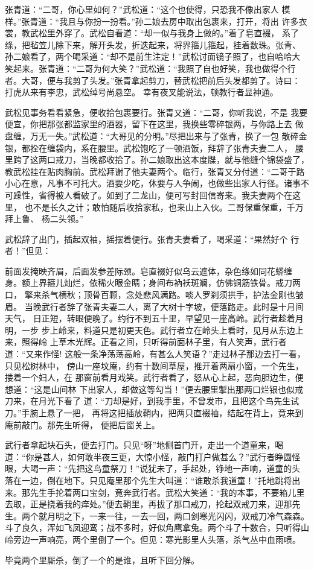 张青道：“二哥，你心里如何？”武松道：“这个也使得，只恐我不像出家人
模样。”张青道：“我且与你扮一扮看。”孙二娘去房中取出包裹来，打开，将出
许多衣裳，教武松里外穿了。武松自看道：“却一似与我身上做的。”着了皂直裰，
系了绦，把毡笠儿除下来，解开头发，折迭起来，将界箍儿箍起，挂着数珠。张青、
孙二娘看了，两个喝采道：“却不是前生注定！”武松讨面镜子照了，也自哈哈大
笑起来。张青道：“二哥为何大笑？”武松道：“我照了自也好笑，我也做得个行
者。大哥，便与我剪了头发。”张青拿起剪刀，替武松把前后头发都剪了。诗曰：
打虎从来有李忠，武松绰号尚悬空。
幸有夜叉能说法，顿教行者显神通。

武松见事务看看紧急，便收拾包裹要行。张青又道：“二哥，你听我说，不是
我要便宜，你把那张都监家里的酒器，留下在这里，我换些零碎银两，与你路上去
做盘缠，万无一失。”武松道：“大哥见的分明。”尽把出来与了张青，换了一包
散碎金银，都拴在缠袋内，系在腰里。武松饱吃了一顿酒饭，拜辞了张青夫妻二人，
腰里跨了这两口戒刀，当晚都收拾了。孙二娘取出这本度牒，就与他缝个锦袋盛了，
教武松挂在贴肉胸前。武松拜谢了他夫妻两个。临行，张青又分付道：“二哥于路
小心在意，凡事不可托大。酒要少吃，休要与人争闹，也做些出家人行径。诸事不
可躁性，省得被人看破了。如到了二龙山，便可写封回信寄来。我夫妻两个在这里，
也不是长久之计；敢怕随后收拾家私，也来山上入伙。二哥保重保重，千万拜上鲁、
杨二头领。”

武松辞了出门，插起双袖，摇摆着便行。张青夫妻看了，喝采道：“果然好个
行者！”但见：

前面发掩映齐眉，后面发参差际颈。皂直裰好似乌云遮体，杂色绦如同花蟒缠
身。额上界箍儿灿烂，依稀火眼金睛；身间布衲袄斑斓，仿佛铜筋铁骨。戒刀两口，
擎来杀气横秋；顶骨百颗，念处悲风满路。啖人罗刹须拱手，护法金刚也皱眉。
当晚武行者辞了张青夫妻二人，离了大树十字坡，便落路走。此时是十月间天气，
日正短，转眼便晚了。约行不到五十里，早望见一座高岭。武行者趁着月明，一步
步上岭来，料道只是初更天色。武行者立在岭头上看时，见月从东边上来，照得岭
上草木光辉。正看之间，只听得前面林子里，有人笑声，武行者道：“又来作怪!
这般一条净荡荡高岭，有甚么人笑语？”走过林子那边去打一看，只见松树林中，
傍山一座坟庵，约有十数间草屋，推开着两扇小窗，一个先生，搂着一个妇人，在
那窗前看月戏笑。武行者看了，怒从心上起，恶向胆边生，便想道：“这是山间林
下出家人，却做这等勾当！”便去腰里掣出那两口烂银也似戒刀来，在月光下看了
道：“刀却是好，到我手里，不曾发市，且把这个鸟先生试刀。”手腕上悬了一把，
再将这把插放鞘内，把两只直裰袖，结起在背上，竟来到庵前敲门。那先生听得，
便把后窗关上。

武行者拿起块石头，便去打门。只见“呀”地侧首门开，走出一个道童来，喝
道：“你是甚人，如何敢半夜三更，大惊小怪，敲门打户做甚么？”武行者睁圆怪
眼，大喝一声：“先把这鸟童祭刀！”说犹未了，手起处，铮地一声响，道童的头
落在一边，倒在地下。只见庵里那个先生大叫道：“谁敢杀我道童！”托地跳将出
来。那先生手抡着两口宝剑，竟奔武行者。武松大笑道：“我的本事，不要箱儿里
去取，正是挠着我的痒处。”便去鞘里，再拔了那口戒刀，抡起双戒刀来，迎那先
生。两个就月明之下，一来一往，一去一回，两口剑寒光闪闪，双戒刀冷气森森。
斗了良久，浑如飞凤迎鸾；战不多时，好似角鹰拿兔。两个斗了十数合，只听得山
岭旁边一声响亮，两个里倒了一个。但见：寒光影里人头落，杀气丛中血雨喷。

毕竟两个里厮杀，倒了一个的是谁，且听下回分解。